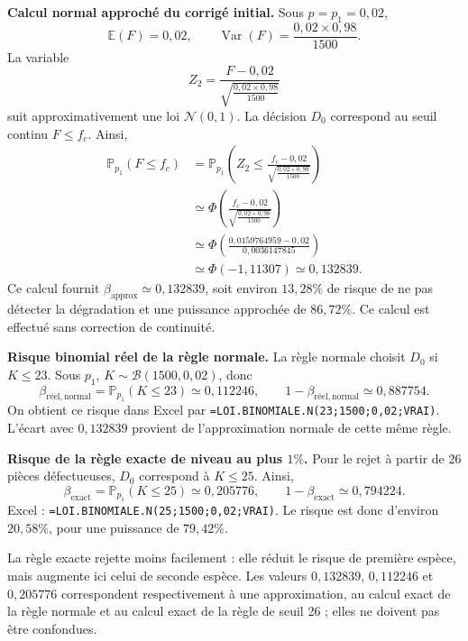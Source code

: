 {\begin{enumerate}
{\textbf{Calcul normal approché du corrigé initial.} Sous $p=p_1=0{,}02$,
\[
\mathbb E(F)=0{,}02,\qquad
\operatorname{Var}(F)=\frac{0{,}02\times0{,}98}{1500}.
\]
La variable
\[
Z_2=\frac{F-0{,}02}{\sqrt{\frac{0{,}02\times0{,}98}{1500}}}
\]
suit approximativement une loi $\mathcal N(0,1)$. La décision $D_0$ correspond au seuil continu $F\leq f_c$. Ainsi,
\begin{align*}
\mathbb P_{p_1}(F\leq f_c)
&=\mathbb P_{p_1}\left(Z_2\leq\frac{f_c-0{,}02}{\sqrt{\frac{0{,}02\times0{,}98}{1500}}}\right)\\
&\simeq\Phi\left(\frac{f_c-0{,}02}{\sqrt{\frac{0{,}02\times0{,}98}{1500}}}\right)\\
&\simeq\Phi\left(\frac{0{,}0159764959-0{,}02}{0{,}0036147845}\right)\\
&\simeq\Phi(-1{,}11307)\simeq0{,}132839.
\end{align*}
Ce calcul fournit $\beta_{\mathrm{approx}}\simeq0{,}132839$, soit environ $13{,}28\%$ de risque de ne pas détecter la dégradation et une puissance approchée de $86{,}72\%$. Ce calcul est effectué sans correction de continuité.

\begin{minipage}{\linewidth}
\textbf{Risque binomial réel de la règle normale.} La règle normale choisit $D_0$ si $K\leq23$. Sous $p_1$, $K\sim\mathcal B(1500,0{,}02)$, donc
\[
\beta_{\mathrm{réel,normal}}=\mathbb P_{p_1}(K\leq23)
\simeq0{,}112246,
\qquad 1-\beta_{\mathrm{réel,normal}}\simeq0{,}887754.
\]
On obtient ce risque dans Excel par
\texttt{=LOI.BINOMIALE.N(23;1500;0,02;VRAI)}.
L'écart avec $0{,}132839$ provient de l'approximation normale de cette même règle.
\end{minipage}

\textbf{Risque de la règle exacte de niveau au plus $1\%$.} Pour le rejet à partir de 26 pièces défectueuses, $D_0$ correspond à $K\leq25$. Ainsi,
\[
\beta_{\mathrm{exact}}=\mathbb P_{p_1}(K\leq25)
\simeq0{,}205776,
\qquad 1-\beta_{\mathrm{exact}}\simeq0{,}794224.
\]
Excel : \texttt{=LOI.BINOMIALE.N(25;1500;0,02;VRAI)}.
Le risque est donc d'environ $20{,}58\%$, pour une puissance de $79{,}42\%$.

\begin{minipage}{\linewidth}
La règle exacte rejette moins facilement : elle réduit le risque de première espèce, mais augmente ici celui de seconde espèce. Les valeurs $0{,}132839$, $0{,}112246$ et $0{,}205776$ correspondent respectivement à une approximation, au calcul exact de la règle normale et au calcul exact de la règle de seuil 26 ; elles ne doivent pas être confondues.
\end{minipage}
}
\end{enumerate}
}
